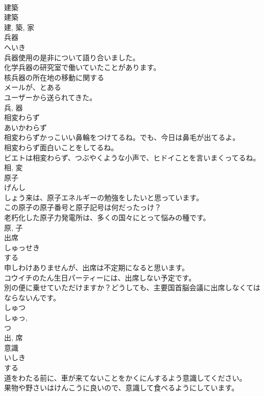 \documentclass[8pt]{extreport}
\begin{document}
\begin{CJK}{UTF8}{min}
\\	建築 
\\	建築 
\\	建, 築, 家	
\\	兵器	
\\	へいき	
\\	兵器使用の是非について語り合いました。	
\\	化学兵器の研究室で働いていたことがあります。	
\\	核兵器の所在地の移動に関する
\\	メールが、とある
\\	ユーザーから送られてきた。	
\\	兵, 器	
\\	相変わらず	
\\	あいかわらず	
\\	相変わらずかっこいい鼻輪をつけてるね。でも、今日は鼻毛が出てるよ。	
\\	相変わらず面白いことをしてるね。	
\\	ビエトは相変わらず、つぶやくような小声で、ヒドイことを言いまくってるね。	
\\	相, 変	
\\	原子	
\\	げんし	
\\	しょう来は、原子エネルギーの勉強をしたいと思っています。	
\\	この原子の原子番号と原子記号は何だったっけ？	
\\	老朽化した原子力発電所は、多くの国々にとって悩みの種です。	
\\	原, 子	
\\	出席	
\\	しゅっせき	
\\	する 
\\	申しわけありませんが、出席は不定期になると思います。	
\\	コウイチのたん生日パーティーには、出席しない予定です。	
\\	別の便に乗せていただけますか？どうしても、主要国首脳会議に出席しなくてはならないんです。	
\\	しゅつ 
\\	しゅっ, 
\\	つ
\\	出, 席	
\\	意識	
\\	いしき	
\\	する 
\\	道をわたる前に、車が来てないことをかくにんするよう意識してください。	
\\	果物や野さいはけんこうに良いので、意識して食べるようにしています。	

\end{CJK}
\end{document}
